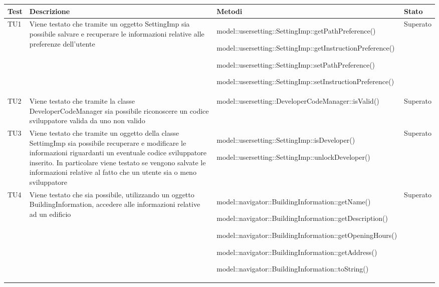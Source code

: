 \documentclass[../PianoDiQualifica.tex]{subfiles}
\begin{document}
\begin{appendices}
\begin{longtabu}to \textwidth {X X X X}
\toprule
\textbf{Test} & \textbf{Descrizione} & \textbf{Metodi} & \textbf{Stato}\\
\midrule
\endhead
{}
TU1 & Viene testato che tramite un oggetto SettingImp sia possibile salvare e recuperare le informazioni relative alle preferenze dell'utente & model::\-usersetting::\-SettingImp::\-getPathPreference() \par model::\-usersetting::\-SettingImp::\-getInstructionPreference() \par model::\-usersetting::\-SettingImp::\-setPathPreference() \par model::\-usersetting::\-SettingImp::\-setInstructionPreference() & Superato \\ 
\midrule 
TU2 & Viene testato che tramite la classe DeveloperCodeManager sia possibile riconoscere un codice sviluppatore valida da uno non valido & model::\-usersetting::\-DeveloperCodeManager::\-isValid() & Superato \\ 
\midrule 
TU3 & Viene testato che tramite un oggetto della classe SettimgImp sia possibile recuperare e modificare le informazioni riguardanti un eventuale codice sviluppatore inserito. In particolare viene testato se vengono salvate le informazioni relative al fatto che un utente sia o meno sviluppatore & model::\-usersetting::\-SettingImp::\-isDeveloper() \par model::\-usersetting::\-SettingImp::\-unlockDeveloper() & Superato \\ 
\midrule 
TU4 & Viene testato che sia possibile, utilizzando un oggetto BuildingInformation, accedere alle informazioni relative ad un edificio & model::\-navigator::\-BuildingInformation::\-getName() \par model::\-navigator::\-BuildingInformation::\-getDescription() \par model::\-navigator::\-BuildingInformation::\-getOpeningHours() \par model::\-navigator::\-BuildingInformation::\-getAddress() \par model::\-navigator::\-BuildingInformation::\-toString() & Superato \\ 
\midrule 

\end{longtabu}
\end{appendices}
\end{document}
